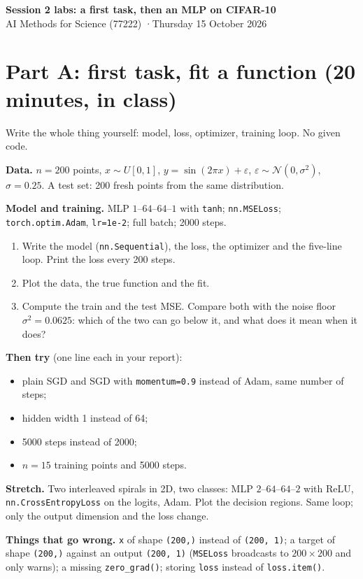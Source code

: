 \documentclass[11pt]{article}
\newcommand{\code}[1]{\texttt{#1}}
\begin{document}
\sloppy
\begin{center}
{\Large\bfseries Session 2 labs: a first task, then an MLP on CIFAR-10}\\[3pt]
AI Methods for Science (77222) \quad·\quad Thursday 15 October 2026
\end{center}

\section*{Part A: first task, fit a function (20 minutes, in class)}
Write the whole thing yourself: model, loss, optimizer, training loop. No given code.

\textbf{Data.} $n=200$ points, $x\sim U[0,1]$, $y=\sin(2\pi x)+\varepsilon$, $\varepsilon\sim\mathcal N(0,\sigma^2)$, $\sigma=0.25$. A test set: 200 fresh points from the same distribution.

\textbf{Model and training.} MLP $1$--$64$--$64$--$1$ with \code{tanh}; \code{nn.MSELoss}; \code{torch.optim.Adam}, \code{lr=1e-2}; full batch; 2000 steps.
\begin{enumerate}
  \item Write the model (\code{nn.Sequential}), the loss, the optimizer and the five-line loop. Print the loss every 200 steps.
  \item Plot the data, the true function and the fit.
  \item Compute the train and the test MSE. Compare both with the noise floor $\sigma^2=0.0625$: which of the two can go below it, and what does it mean when it does?
\end{enumerate}
\textbf{Then try} (one line each in your report):
\begin{itemize}
  \item plain SGD and SGD with \code{momentum=0.9} instead of Adam, same number of steps;
  \item hidden width 1 instead of 64;
  \item 5000 steps instead of 2000;
  \item $n=15$ training points and 5000 steps.
\end{itemize}
\textbf{Stretch.} Two interleaved spirals in 2D, two classes: MLP $2$--$64$--$64$--$2$ with ReLU, \code{nn.CrossEntropyLoss} on the logits, Adam. Plot the decision regions. Same loop; only the output dimension and the loss change.

\textbf{Things that go wrong.} \code{x} of shape \code{(200,)} instead of \code{(200, 1)}; a target of shape \code{(200,)} against an output \code{(200, 1)} (\code{MSELoss} broadcasts to $200\times200$ and only warns); a missing \code{zero\_grad()}; storing \code{loss} instead of \code{loss.item()}.
\end{document}
